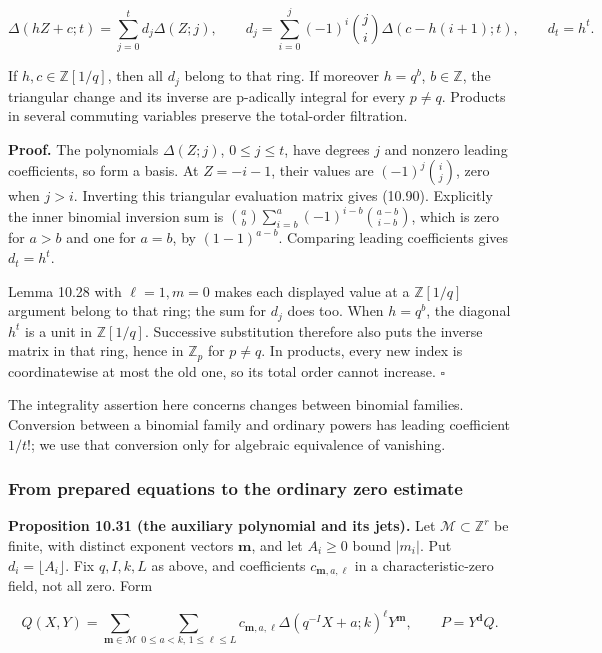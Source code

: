 \documentclass[
  11pt,
  a4paper,
]{article}
\begin{document}
\[
\Delta(hZ+c;t)=\sum_{j=0}^t d_j\Delta(Z;j),\qquad
d_j=\sum_{i=0}^j(-1)^i\binom ji\Delta(c-h(i+1);t),
\qquad d_t=h^t.
\tag{10.90}
\]

If \(h,c\in\mathbb Z[1/q]\), then all \(d_j\) belong to that ring. If
moreover \(h=q^b\), \(b\in\mathbb Z\), the triangular change and its
inverse are p-adically integral for every \(p\ne q\). Products in
several commuting variables preserve the total-order filtration.

\textbf{Proof.} The polynomials \(\Delta(Z;j)\), \(0\le j\le t\), have
degrees \(j\) and nonzero leading coefficients, so form a basis. At
\(Z=-i-1\), their values are \((-1)^j\binom ij\), zero when \(j>i\).
Inverting this triangular evaluation matrix gives (10.90). Explicitly
the inner binomial inversion sum is
\(\binom ab\sum_{i=b}^a(-1)^{i-b}\binom{a-b}{i-b}\), which is zero for
\(a>b\) and one for \(a=b\), by \((1-1)^{a-b}\). Comparing leading
coefficients gives \(d_t=h^t\).

Lemma 10.28 with \(\ell=1,m=0\) makes each displayed value at a
\(\mathbb Z[1/q]\) argument belong to that ring; the sum for \(d_j\)
does too. When \(h=q^b\), the diagonal \(h^t\) is a unit in
\(\mathbb Z[1/q]\). Successive substitution therefore also puts the
inverse matrix in that ring, hence in \(\mathbb Z_p\) for \(p\ne q\). In
products, every new index is coordinatewise at most the old one, so its
total order cannot increase. \(\square\)

The integrality assertion here concerns changes between binomial
families. Conversion between a binomial family and ordinary powers has
leading coefficient \(1/t!\); we use that conversion only for algebraic
equivalence of vanishing.

\subsubsection{From prepared equations to the ordinary zero
estimate}\label{from-prepared-equations-to-the-ordinary-zero-estimate}

\textbf{Proposition 10.31 (the auxiliary polynomial and its jets).} Let
\(\mathcal M\subset\mathbb Z^r\) be finite, with distinct exponent
vectors \(\boldsymbol m\), and let \(A_i\ge0\) bound \(|m_i|\). Put
\(d_i=\lfloor A_i\rfloor\). Fix \(q,I,k,L\) as above, and coefficients
\(c_{\boldsymbol m,a,\ell}\) in a characteristic-zero field, not all
zero. Form

\[
Q(X,Y)=\sum_{\boldsymbol m\in\mathcal M}
\sum_{0\le a<k,\,1\le\ell\le L}
c_{\boldsymbol m,a,\ell}\Delta(q^{-I}X+a;k)^\ell Y^{\boldsymbol m},
\qquad P=Y^{\boldsymbol d}Q.
\tag{10.91}
\]
\end{document}
